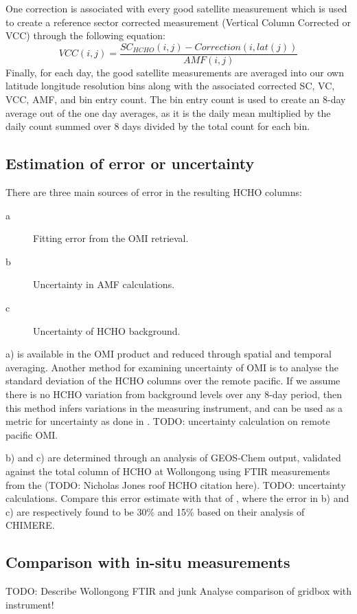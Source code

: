     One correction is associated with every good satellite measurement which is used to create a reference sector corrected measurement (Vertical Column Corrected or VCC) through the following equation:
    \begin{equation}
      VCC(i,j) = \frac{SC_{HCHO}(i,j) - Correction(i,lat(j))}{AMF(i,j)}
    \end{equation}
    Finally, for each day, the good satellite measurements are averaged into our own latitude longitude resolution bins along with the associated corrected SC, VC, VCC, AMF, and bin entry count.
    The bin entry count is used to create an 8-day average out of the one day averages, as it is the daily mean multiplied by the daily count summed over 8 days divided by the total count for each bin.
    
  \subsection{Estimation of error or uncertainty}
  \label{ch_HCHO:sec:OMI_uncertainty_calculation}
    There are three main sources of error in the resulting HCHO columns:
    \begin{description}
      \item[a] Fitting error from the OMI retrieval.
      \item[b] Uncertainty in AMF calculations.
      \item[c] Uncertainty of HCHO background.
    \end{description}

    a) is available in the OMI product and reduced through spatial and temporal averaging.
    Another method for examining uncertainty of OMI is to analyse the standard deviation of the HCHO columns over the remote pacific.
    If we assume there is no HCHO variation from background levels over any 8-day period, then this method infers variations in the measuring instrument, and can be used as a metric for uncertainty as done in \citet{DeSmedt2012}.
    TODO: uncertainty calculation on remote pacific OMI.
    
    b) and c) are determined through an analysis of GEOS-Chem output, validated against the total column of HCHO at Wollongong using FTIR measurements from the (TODO: Nicholas Jones roof HCHO citation here).
    TODO: uncertainty calculations.
    Compare this error estimate with that of \citet{Curci2010}, where the error in b) and c) are respectively found to be 30\% and 15\% based on their analysis of CHIMERE.
  
  \subsection{Comparison with in-situ measurements}
    TODO: Describe Wollongong FTIR and junk
    Analyse comparison of gridbox with instrument!

    

